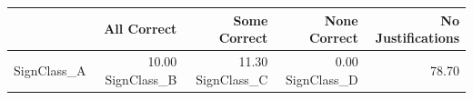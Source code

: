 \begin{tabular}{lrrrr}
\toprule
 & All Correct & Some Correct & None Correct & No Justifications \\
\midrule
SignClass_A & 10.00%
SignClass_B & 11.30%
SignClass_C & 0.00%
SignClass_D & 78.70%
\bottomrule
\end{tabular}
